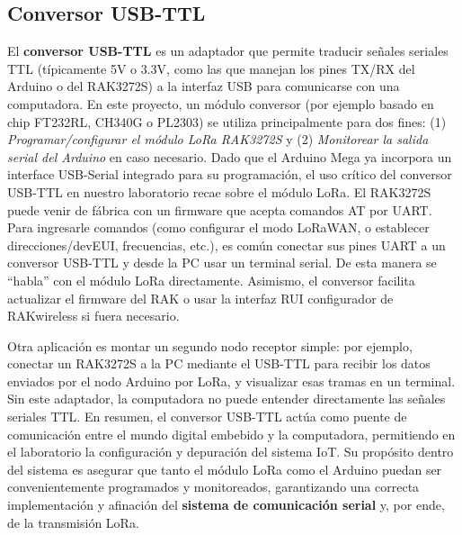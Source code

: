 \subsection{Conversor USB-TTL}
El \textbf{conversor USB-TTL} es un adaptador que permite traducir señales seriales TTL (típicamente 5V o 3.3V, como las que manejan los pines TX/RX del Arduino o del RAK3272S) a la interfaz USB para comunicarse con una computadora. En este proyecto, un módulo conversor (por ejemplo basado en chip FT232RL, CH340G o PL2303) se utiliza principalmente para dos fines: (1) \textit{Programar/configurar el módulo LoRa RAK3272S} y (2) \textit{Monitorear la salida serial del Arduino} en caso necesario. Dado que el Arduino Mega ya incorpora un interface USB-Serial integrado para su programación, el uso crítico del conversor USB-TTL en nuestro laboratorio recae sobre el módulo LoRa. El RAK3272S puede venir de fábrica con un firmware que acepta comandos AT por UART. Para ingresarle comandos (como configurar el modo LoRaWAN, o establecer direcciones/devEUI, frecuencias, etc.), es común conectar sus pines UART a un conversor USB-TTL y desde la PC usar un terminal serial. De esta manera se “habla” con el módulo LoRa directamente. Asimismo, el conversor facilita actualizar el firmware del RAK o usar la interfaz RUI configurador de RAKwireless si fuera necesario.

Otra aplicación es montar un segundo nodo receptor simple: por ejemplo, conectar un RAK3272S a la PC mediante el USB-TTL para recibir los datos enviados por el nodo Arduino por LoRa, y visualizar esas tramas en un terminal. Sin este adaptador, la computadora no puede entender directamente las señales seriales TTL. En resumen, el conversor USB-TTL actúa como puente de comunicación entre el mundo digital embebido y la computadora, permitiendo en el laboratorio la configuración y depuración del sistema IoT. Su propósito dentro del sistema es asegurar que tanto el módulo LoRa como el Arduino puedan ser convenientemente programados y monitoreados, garantizando una correcta implementación y afinación del \textbf{sistema de comunicación serial} y, por ende, de la transmisión LoRa.